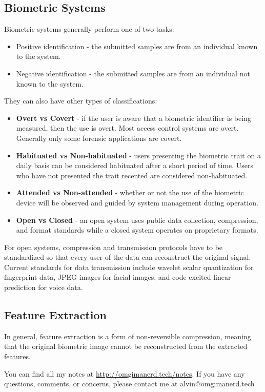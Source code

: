 \documentclass{math}
\begin{document}
\subsection*{Biometric Systems}
Biometric systems generally perform one of two tasks:
\begin{itemize}
  \item Positive identification - the submitted samples are from an individual
    known to the system.
  \item Negative identification - the submitted samples are from an individual
    not known to the system.
\end{itemize}
They can also have other types of classifications:
\begin{itemize}
  \item \textbf{Overt vs Covert} - if the user is aware that a biometric
    identifier is being measured, then the use is overt. Most access control
    systems are overt. Generally only some forensic applications are covert.
  \item \textbf{Habituated vs Non-habituated} - users presenting the biometric
    trait on a daily basis can be considered habituated after a short period of
    time. Users who have not presented the trait recented are considered
    non-habituated.
  \item \textbf{Attended vs Non-attended} - whether or not the use of the
    biometric device will be observed and guided by system management during
    operation.
  \item \textbf{Open vs Closed} - an open system uses public data collection,
    compression, and format standards while a closed system operates on
    proprietary formats.
\end{itemize}
For open systems, compression and transmission protocols have to be
standardized so that every user of the data can reconstruct the original signal.
Current standards for data transmission include wavelet scalar quantization
for fingerprint data, JPEG images for facial images, and code excited linear
prediction for voice data.

\subsection*{Feature Extraction}
In general, feature extraction is a form of non-reversible compression,
meaning that the original biometric image cannot be reconstructed from the
extracted features.

\begin{center}
  You can find all my notes at \url{http://omgimanerd.tech/notes}. If you have
  any questions, comments, or concerns, please contact me at
  alvin@omgimanerd.tech
\end{center}
\end{document}
